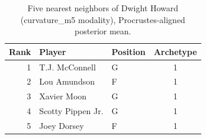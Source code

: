 \begin{table}[htbp]
  \centering\small
  \begin{tabular}{rllc}
    \toprule
    Rank & Player & Position & Archetype \\
    \midrule
    1 & T.J. McConnell & G & 1 \\
    2 & Lou Amundson & F & 1 \\
    3 & Xavier Moon & G & 1 \\
    4 & Scotty Pippen Jr. & G & 1 \\
    5 & Joey Dorsey & F & 1 \\
    \bottomrule
  \end{tabular}
  \caption{Five nearest neighbors of Dwight Howard (curvature_m5 modality), Procrustes-aligned posterior mean.}
  \label{tab:Dwight_Howard_neighbors_curvature_m5}
\end{table}

